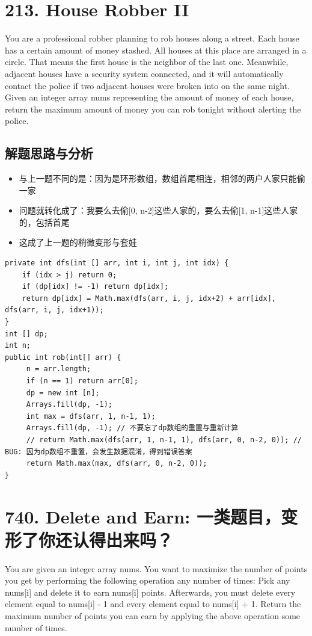 \documentclass[9pt, b5paaper]{book}
\begin{document}
\section{213. House Robber II}
\label{sec-1-3}
You are a professional robber planning to rob houses along a street. Each house has a certain amount of money stashed. All houses at this place are arranged in a circle. That means the first house is the neighbor of the last one. Meanwhile, adjacent houses have a security system connected, and it will automatically contact the police if two adjacent houses were broken into on the same night.
Given an integer array nums representing the amount of money of each house, return the maximum amount of money you can rob tonight without alerting the police.
\subsection{解题思路与分析}
\label{sec-1-3-1}
\begin{itemize}
\item 与上一题不同的是：因为是环形数组，数组首尾相连，相邻的两户人家只能偷一家
\item 问题就转化成了：我要么去偷[0, n-2]这些人家的，要么去偷[1, n-1]这些人家的，包括首尾
\item 这成了上一题的稍微变形与套娃
\end{itemize}
\begin{verbatim}
private int dfs(int [] arr, int i, int j, int idx) {
    if (idx > j) return 0;
    if (dp[idx] != -1) return dp[idx];
    return dp[idx] = Math.max(dfs(arr, i, j, idx+2) + arr[idx], dfs(arr, i, j, idx+1));
}
int [] dp;
int n;
public int rob(int[] arr) {
     n = arr.length;
     if (n == 1) return arr[0];
     dp = new int [n];
     Arrays.fill(dp, -1);
     int max = dfs(arr, 1, n-1, 1);
     Arrays.fill(dp, -1); // 不要忘了dp数组的重置与重新计算
     // return Math.max(dfs(arr, 1, n-1, 1), dfs(arr, 0, n-2, 0)); // BUG: 因为dp数组不重置，会发生数据混淆，得到错误答案
     return Math.max(max, dfs(arr, 0, n-2, 0));
}
\end{verbatim}
\section{740. Delete and Earn: 一类题目，变形了你还认得出来吗？}
\label{sec-1-4}
You are given an integer array nums. You want to maximize the number of points you get by performing the following operation any number of times:
Pick any nums[i] and delete it to earn nums[i] points. Afterwards, you must delete every element equal to nums[i] - 1 and every element equal to nums[i] + 1.
Return the maximum number of points you can earn by applying the above operation some number of times.
\end{document}
